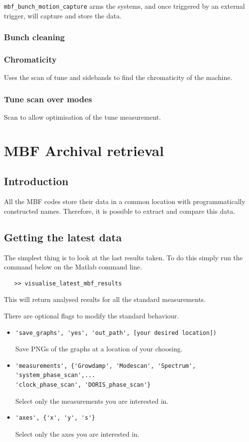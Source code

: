 \documentclass{report}
\begin{document}
 \verb|mbf_bunch_motion_capture| arms the systems, and once triggered by an external trigger, will capture and store the data.
\subsection{Bunch cleaning}
\subsection{Chromaticity}
Uses the scan of tune and sidebands to find the chromaticity of the machine.
\subsection{Tune scan over modes}
Scan to allow optimisation of the tune measurement.

\chapter{MBF Archival retrieval}

\section{Introduction}

All the MBF codes store their data in a common location with programmatically constructed names. Therefore, it is possible to extract and compare this data. 

\section{Getting the latest data} 

The simplest thing is to look at the last results taken. To do this simply run the command below on the Matlab command line. 
\begin{verbatim}
   >> visualise_latest_mbf_results 
\end{verbatim}
 This will return analysed results for all the standard measurements.
 
 There are optional flags to modify the standard behaviour.
 \begin{itemize}
     \item {\begin{verbatim}
'save_graphs', 'yes', 'out_path', [your desired location])
\end{verbatim}
Save PNGs of the graphs at a location of your choosing.}
   \item {\begin{verbatim}
'measurements', {'Growdamp', 'Modescan', 'Spectrum', 'system_phase_scan',...
'clock_phase_scan', 'DORIS_phase_scan'}
\end{verbatim}
Select only the measurements you are interested in.}
   \item {\begin{verbatim}
'axes', {'x', 'y', 's'}
\end{verbatim}
Select only the axes you are interested in.}
 \end{itemize}
 
\end{document}
